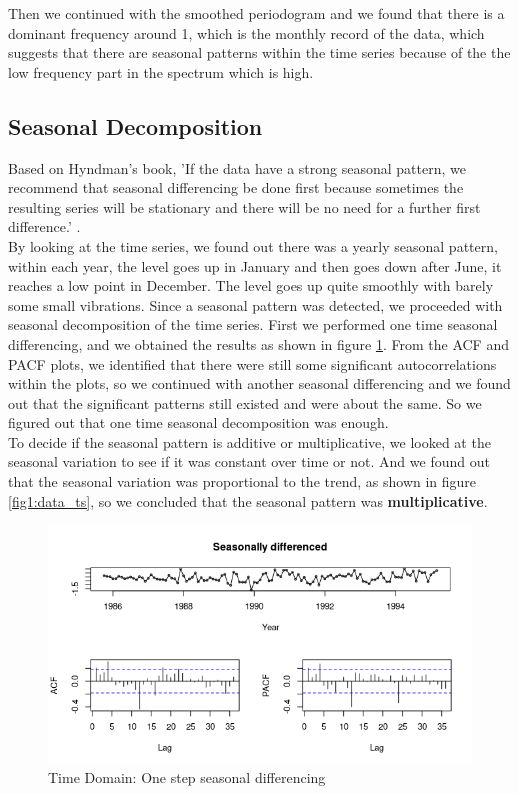 \documentclass[journal, a4paper]{IEEEtran}
\begin{document}
Then we continued with the smoothed periodogram and we found that there is a dominant frequency around 1, which is the monthly record of the data, which suggests that there are seasonal patterns within the time series because of the the low frequency part in the spectrum which is high.

\subsection{Seasonal Decomposition}
Based on Hyndman's book,  'If the data have a strong seasonal pattern, we recommend that seasonal differencing be done first because sometimes the resulting series will be stationary and there will be no need for a further first difference.' \cite{fpp}.\\
By looking at the time series, we found out there was a yearly seasonal pattern, within each year, the level goes up in January and then goes down after June, it reaches a low point in December. The level goes up quite smoothly with barely some small vibrations.
Since a seasonal pattern was detected, we proceeded with seasonal decomposition of the time series. First we performed one time seasonal differencing, and we obtained the results as shown in figure \ref{fig1:seasonal}. From the ACF and PACF plots, we identified that there were still some significant autocorrelations within the plots, so we continued with another seasonal differencing and we found out that the significant patterns still existed and were about the same. So we figured out that one time seasonal decomposition was enough.\\
To decide if the seasonal pattern is additive or multiplicative, we looked at the seasonal variation to see if it was constant over time or not. And we found out that the seasonal variation was proportional to the trend, as shown in figure \ref{fig1:data_ts}, so we concluded that the seasonal pattern was \textbf{multiplicative}.

\begin{figure}[H]
\begin{center}
\includegraphics[scale=0.45]{fig1/data_sd1.png}
\caption{Time Domain: One step seasonal differencing}
\label{fig1:seasonal}
\end{center}
\end{figure}
\end{document}

